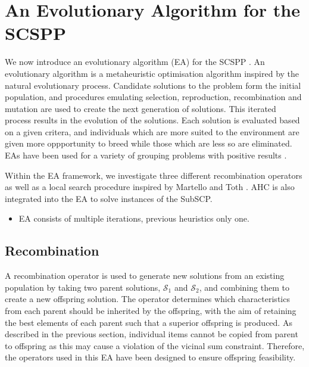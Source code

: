 \documentclass{elsarticle}
\begin{document}
\section{An Evolutionary Algorithm for the SCSPP}
\label{sec:ea}
\noindent We now introduce an evolutionary algorithm (EA) for the SCSPP . An evolutionary algorithm is a metaheuristic optimisation algorithm inspired by the natural evolutionary process. Candidate solutions to the problem form the initial population, and procedures emulating selection, reproduction, recombination and mutation are used to create the next generation of solutions. This iterated process results in the evolution of the solutions. Each solution is evaluated based on a given critera, and individuals which are more suited to the environment are given more oppportunity to breed while those which are less so are eliminated. EAs have been used for a variety of grouping problems with positive results \cite{lewis2017, falkenauer1996, quiroz2015}. 

Within the EA framework, we investigate three different recombination operators as well as a local search procedure inspired by Martello and Toth \cite{martello1990l}. AHC is also integrated into the EA to solve instances of the SubSCP.

{\color{myRed}
\begin{itemize}[leftmargin=*]
	\item EA consists of multiple iterations, previous heuristics only one.
\end{itemize}
}

\subsection{Recombination}
\label{sub:xover}
\noindent A recombination operator is used to generate new solutions from an existing population by taking two parent solutions, $\mathcal{S}_1$ and $\mathcal{S}_2$, and combining them to create a new offspring solution. The operator determines which characteristics from each parent should be inherited by the offspring, with the aim of retaining the best elements of each parent such that a superior offspring is produced. As described in the previous section, individual items cannot be copied from parent to offspring as this may cause a violation of the vicinal sum constraint. Therefore, the operators used in this EA have been designed to ensure offspring feasibility.
\end{document}
